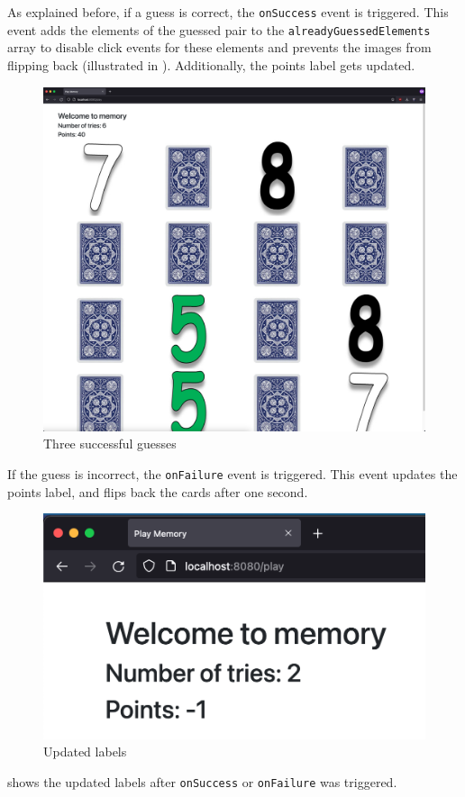 As explained before, if a guess is correct, the \texttt{onSuccess} event is triggered. This event adds the elements of the guessed pair to the \texttt{alreadyGuessedElements} array to disable click events for these elements and prevents the images from flipping back (illustrated in ). Additionally, the points label gets updated.
\begin{figure}[h]
\centering
\includegraphics[scale=0.1]{images/03_impl/frontend/flipped-cards}
\caption{Three successful guesses}
\label{fig:03_impl_frontend_memGame_flippedCards}
\end{figure}
If the guess is incorrect, the \texttt{onFailure} event is triggered. This event updates the points label, and flips back the cards after one second.
\begin{figure}[h]
\centering
\includegraphics[scale=0.3]{images/03_impl/frontend/updated-labels}
\caption{Updated labels}
\label{fig:03_impl_frontend_memGame_updateLabels}
\end{figure}
 shows the updated labels after \texttt{onSuccess} or \texttt{onFailure} was triggered.

